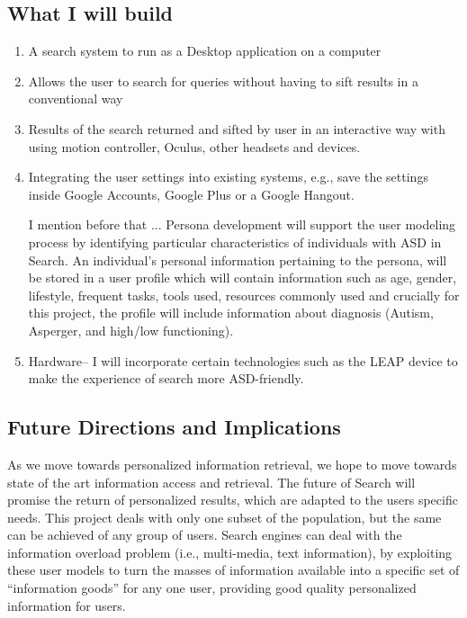 \documentclass[10pt]{article}
\begin{document}
\subsection{What I will build}
\begin{enumerate}
\item A search system to run as a Desktop application on a computer 
\item Allows the user to search for queries without having to sift results in a conventional way
\item Results of the search returned and sifted by user in an interactive way with using motion controller, Oculus, other headsets and devices.
\item Integrating the user settings into existing systems, e.g., save the settings inside Google Accounts, Google Plus or a Google Hangout.

I mention before that ... Persona development will support the user modeling process by identifying particular characteristics of individuals with ASD in Search. An individual’s personal information pertaining to the persona, will be stored in a user profile which will contain information such as age, gender, lifestyle, frequent tasks, tools used, resources commonly used and crucially for this project, the profile will include information about diagnosis (Autism, Asperger, and high/low functioning).

\item Hardware– I will incorporate certain technologies such as the LEAP device to make the experience of search more ASD-friendly.

\end{enumerate}
\subsection{Future Directions and Implications}
As we move towards personalized information retrieval, we hope to move towards state of the art information access and retrieval. The future of Search will promise the return of personalized results, which are adapted to the users specific needs. This project deals with only one subset of the population, but the same can be achieved of any group of users. Search engines can deal with the information overload problem (i.e., multi-media, text information), by exploiting these user models to turn the masses of information available into a specific set of “information goods” for any one user, providing good quality personalized information for users.
\end{document}
